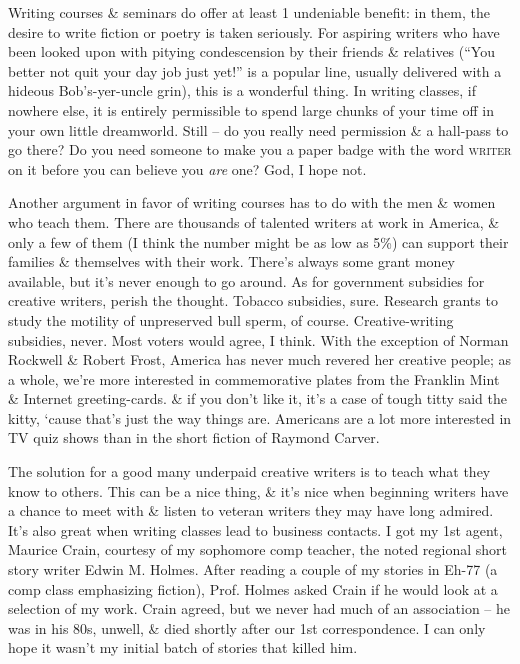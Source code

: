 \documentclass{article}
\numberwithin{equation}{section}
\begin{document}
Writing courses \& seminars do offer at least 1 undeniable benefit: in them, the desire to write fiction or poetry is taken seriously. For aspiring writers who have been looked upon with pitying condescension by their friends \& relatives (``You better not quit your day job just yet!'' is a popular line, usually delivered with a hideous Bob's-yer-uncle grin), this is a wonderful thing. In writing classes, if nowhere else, it is entirely permissible to spend large chunks of your time off in your own little dreamworld. Still -- do you really need permission \& a hall-pass to go there? Do you need someone to make you a paper badge with the word \textsc{writer} on it before you can believe you \textit{are} one? God, I hope not.

Another argument in favor of writing courses has to do with the men \& women who teach them. There are thousands of talented writers at work in America, \& only a few of them (I think the number might be as low as 5\%) can support their families \& themselves with their work. There's always some grant money available, but it's never enough to go around. As for government subsidies for creative writers, perish the thought. Tobacco subsidies, sure. Research grants to study the motility of unpreserved bull sperm, of course. Creative-writing subsidies, never. Most voters would agree, I think. With the exception of Norman Rockwell \& Robert Frost, America has never much revered her creative people; as a whole, we're more interested in commemorative plates from the Franklin Mint \& Internet greeting-cards. \& if you don't like it, it's a case of tough titty said the kitty, `cause that's just the way things are. Americans are a lot more interested in TV quiz shows than in the short fiction of Raymond Carver.

The solution for a good many underpaid creative writers is to teach what they know to others. This can be a nice thing, \& it's nice when beginning writers have a chance to meet with \& listen to veteran writers they may have long admired. It's also great when writing classes lead to business contacts. I got my 1st agent, Maurice Crain, courtesy of my sophomore comp teacher, the noted regional short story writer Edwin M. Holmes. After reading a couple of my stories in Eh-77 (a comp class emphasizing fiction), Prof. Holmes asked Crain if he would look at a selection of my work. Crain agreed, but we never had much of an association -- he was in his 80s, unwell, \& died shortly after our 1st correspondence. I can only hope it wasn't my initial batch of stories that killed him.
\end{document}
